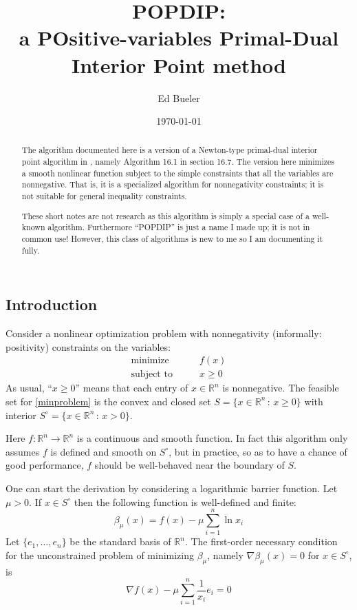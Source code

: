 \documentclass[11pt]{article}
\title{POPDIP: \\ a POsitive-variables Primal-Dual Interior Point method}
\author{Ed Bueler}
\date{\today}
\newcommand{\RR}{\mathbb{R}}
\newcommand{\grad}{\nabla}
\begin{document}
\maketitle

\begin{abstract}
The algorithm documented here is a version of a Newton-type primal-dual interior point algorithm in \cite{GrivaNashSofer2009}, namely Algorithm 16.1 in section 16.7.  The version here minimizes a smooth nonlinear function subject to the simple constraints that all the variables are nonnegative.  That is, it is a specialized algorithm for nonnegativity constraints; it is not suitable for general inequality constraints.

These short notes are not research as this algorithm is simply a special case of a well-known algorithm.  Furthermore ``POPDIP'' is just a name I made up; it is not in common use!  However, this class of algorithms is new to me so I am documenting it fully.
\end{abstract}

\thispagestyle{empty}

\bigskip
\subsection*{Introduction}

Consider a nonlinear optimization problem with nonnegativity (informally: positivity) constraints on the variables:
\begin{equation}
\begin{matrix}
\text{minimize} \qquad & f(x) \\
\text{subject to} \qquad & x \ge 0
\end{matrix} \label{minproblem}
\end{equation}
As usual, ``$x\ge 0$'' means that each entry of $x\in\RR^n$ is nonnegative.  The feasible set for \eqref{minproblem} is the convex and closed set $S = \{x\in \RR^n\,:\,x\ge 0\}$ with interior $S^\circ = \{x\in \RR^n\,:\,x > 0\}$.

Here $f:\RR^n \to\RR^n$ is a continuous and smooth function.  In fact this algorithm only assumes $f$ is defined and smooth on $S^\circ$, but in practice, so as to have a chance of good performance, $f$ should be well-behaved near the boundary of $S$.

One can start the derivation by considering a logarithmic barrier function.  Let $\mu>0$.  If $x\in S^\circ$ then the following function is well-defined and finite:
\begin{equation}
\beta_\mu(x) = f(x) - \mu \sum_{i=1}^n \ln x_i \label{barrierfunction}
\end{equation}
Let $\{e_1,\dots,e_n\}$ be the standard basis of $\RR^n$.  The first-order necessary condition for the unconstrained problem of minimizing $\beta_\mu$, namely $\grad \beta_\mu(x)=0$ for $x \in S^\circ$, is
\begin{equation}
\grad f(x) - \mu \sum_{i=1}^n \frac{1}{x_i} e_i = 0 \label{firstorderbarrier}
\end{equation}
\end{document}
